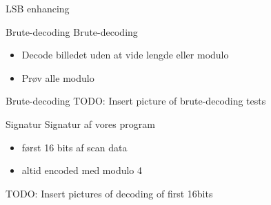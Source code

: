 \begin{frame}{LSB enhancing}
\begin{figure}
\centering
{}
\end{figure}
\caption{Begge billede}
\end{frame}

\begin{frame}{Brute-decoding}
	Brute-decoding
		\begin{itemize}
		\item Decode billedet uden at vide lengde eller modulo
		\item Prøv alle modulo
		\end{itemize}
\end{frame}

\begin{frame}{Brute-decoding}
TODO: Insert picture of brute-decoding tests
\end{frame}

\begin{frame}{Signatur}
	Signatur af vores program
		\begin{itemize}
		\item først 16 bits af scan data
		\item altid encoded med modulo 4
		\end{itemize}
\end{frame}

\begin{frame}
TODO: Insert pictures of decoding of first 16bits
\end{frame}